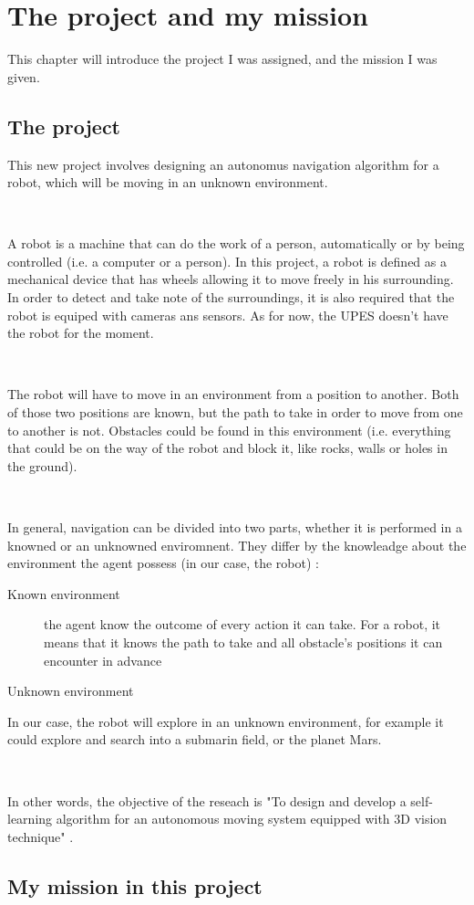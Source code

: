 \chapter{The project and my mission}

This chapter will introduce the project I was assigned, and the mission I was given.

\section{The project}

This new project involves designing an autonomus navigation algorithm for a robot, which will be moving in an unknown environment. 

~~

A robot is a machine that can do the work of a person, automatically or by being controlled (i.e. a computer or a person). 
In this project, a robot is defined as a mechanical device that has wheels allowing it to move freely in his surrounding. 
In order to detect and take note of the surroundings, it is also required that the robot is equiped with cameras ans sensors. 
As for now, the \gls{UPES} doesn't have the robot for the moment. 

~~

The robot will have to move in an environment from a position to another. Both of those two positions are known, but the path to take in order to move from one to another is not. Obstacles could be found in this environment (i.e. everything that could be on the way of the robot and block it, like rocks, walls or holes in the ground). 

~~

In general, navigation can be divided into two parts, whether it is performed in a knowned or an unknowned enviromnent. They differ by the knowleadge about the environment the agent possess (in our case, the robot) : 
\begin{description}
	\item[Known environment] the agent know the outcome of every action it can take. For a robot, it means that it knows the path to take and all obstacle's positions it can encounter in advance 
	\item[Unknown environment] 
\end{description}
In our case, the robot will explore in an unknown environment, for example it could explore and search into a submarin field, or the planet Mars. 




~~

In other words, the objective of the reseach is "To design and develop a self-learning algorithm for an autonomous moving system equipped with 3D vision technique" \cite{bib:niharika}.



\section{My mission in this project}
